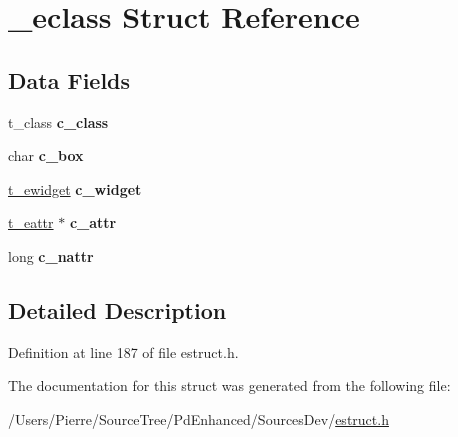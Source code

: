 \hypertarget{struct__eclass}{\section{\-\_\-eclass Struct Reference}
\label{struct__eclass}
}
\subsection*{Data Fields}
\begin{DoxyCompactItemize}
\item 
\hypertarget{struct__eclass_a0469b08ed4568634e94e1ef9844987dc}{t\-\_\-class {\bfseries c\-\_\-class}}\label{struct__eclass_a0469b08ed4568634e94e1ef9844987dc}

\item 
\hypertarget{struct__eclass_a86d57fd0700572f515dcadd123b81748}{char {\bfseries c\-\_\-box}}\label{struct__eclass_a86d57fd0700572f515dcadd123b81748}

\item 
\hypertarget{struct__eclass_ae7433b03225f5ef8d13d025e6545952c}{\hyperlink{struct__ewidget}{t\-\_\-ewidget} {\bfseries c\-\_\-widget}}\label{struct__eclass_ae7433b03225f5ef8d13d025e6545952c}

\item 
\hypertarget{struct__eclass_a5770c150b221e33c7502b23d066675fa}{\hyperlink{struct__eattr}{t\-\_\-eattr} $\ast$ {\bfseries c\-\_\-attr}}\label{struct__eclass_a5770c150b221e33c7502b23d066675fa}

\item 
\hypertarget{struct__eclass_a2214009a25c6ee1b8b41008f15995c85}{long {\bfseries c\-\_\-nattr}}\label{struct__eclass_a2214009a25c6ee1b8b41008f15995c85}

\end{DoxyCompactItemize}


\subsection{Detailed Description}


Definition at line 187 of file estruct.\-h.



The documentation for this struct was generated from the following file\-:\begin{DoxyCompactItemize}
\item 
/\-Users/\-Pierre/\-Source\-Tree/\-Pd\-Enhanced/\-Sources\-Dev/\hyperlink{estruct_8h}{estruct.\-h}\end{DoxyCompactItemize}
